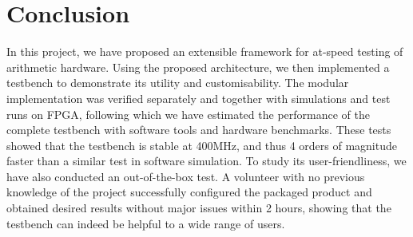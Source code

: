 \chapter{Conclusion}

In this project, we have proposed an extensible framework for at-speed testing of arithmetic hardware.
Using the proposed architecture, we then implemented a testbench to demonstrate its utility and customisability.
The modular implementation was verified separately and together with simulations and test runs on FPGA, following which we have estimated the performance of the complete testbench with software tools and hardware benchmarks.
These tests showed that the testbench is stable at 400MHz, and thus 4 orders of magnitude faster than a similar test in software simulation.
To study its user-friendliness, we have also conducted an out-of-the-box test.
A volunteer with no previous knowledge of the project successfully configured the packaged product and obtained desired results without major issues within 2 hours, showing that the testbench can indeed be helpful to a wide range of users.
